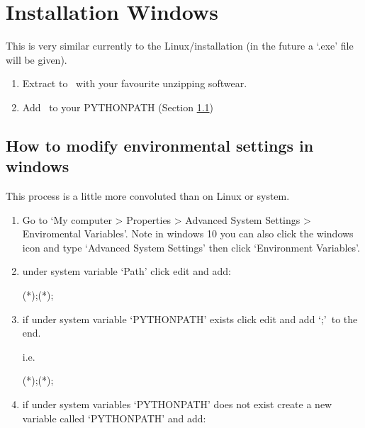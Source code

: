 \clearpage
\newpage
\section{Installation Windows}
\label{ch:install:install_win}

This is very similar currently to the Linux/\mac installation (in the future a `.exe' file will be given).

\begin{enumerate}
\item Extract to \InstallDIR\, with your favourite unzipping softwear.
\item Add \InstallDIR\, to your PYTHONPATH (Section \ref{ch:install:install_win:environ_settings})
\end{enumerate}

\subsection{How to modify environmental settings in windows}
\label{ch:install:install_win:environ_settings}

This process is a little more convoluted than on Linux or \mac system.

\begin{enumerate}
\item Go to `My computer > Properties > Advanced System Settings > Enviromental Variables'. Note in windows 10 you can also click the windows icon and type `Advanced System Settings' then click `Environment Variables'.


\item under system variable `Path' click edit and add:
\begin{textbox}[title={In "Enviromental Variables"}]
(*\InstallDIR*);(*\InstallDIR*)\bin;
\end{textbox}

\item if under system variable `PYTHONPATH' exists click edit and add `\InstallDIR;'\, to the end.

\noindent i.e.

\begin{textbox}[title={In "Enviromental Variables"}]
(*\InstallDIR*);(*\InstallDIR*)\bin;
\end{textbox}

\item if under system variables `PYTHONPATH' does not exist create a new variable called `PYTHONPATH' and add:

\begin{textbox}[title={In "Enviromental Variables"}]
\end{textbox}

\end{enumerate}

